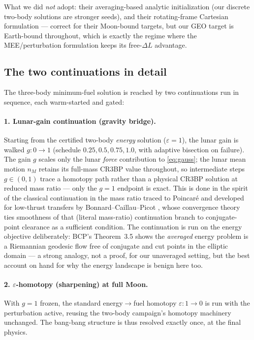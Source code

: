\documentclass[11pt]{article}
\begin{document}
What we did \emph{not} adopt: their averaging-based analytic initialization
(our discrete two-body solutions are stronger seeds), and their
rotating-frame Cartesian formulation --- correct for their Moon-bound
targets, but our GEO target is Earth-bound throughout, which is exactly the
regime where the MEE/perturbation formulation keeps its free-$\Delta L$
advantage.

\subsection{The two continuations in detail}

The three-body minimum-fuel solution is reached by two continuations run in
sequence, each warm-started and gated:

\paragraph{1. Lunar-gain continuation (gravity bridge).}\label{sec:mubridge}
Starting from the certified two-body \emph{energy} solution
($\varepsilon = 1$), the lunar gain is walked $g: 0 \to 1$
(schedule $0.25, 0.5, 0.75, 1.0$, with adaptive bisection on failure). The
gain $g$ scales only the lunar \emph{force} contribution to
\eqref{eq:gauss}; the lunar mean motion $n_M$ retains its full-mass CR3BP
value throughout, so intermediate steps $g \in (0,1)$ trace a homotopy
path rather than a physical CR3BP solution at reduced mass ratio --- only
the $g = 1$ endpoint is exact. This is done in the spirit of the classical
continuation in the mass ratio traced to Poincar\'e and developed for
low-thrust transfers by Bonnard--Caillau--Picot \cite{BCP2010}, whose
convergence theory ties smoothness of that (literal mass-ratio)
continuation branch to conjugate-point clearance as a sufficient
condition. The continuation is run on the energy objective deliberately:
BCP's Theorem~3.5 shows the \emph{averaged} energy problem is a Riemannian
geodesic flow free of conjugate and cut points in the elliptic domain
\cite{BCP2010} --- a strong analogy, not a proof, for our unaveraged
setting, but the best account on hand for why the energy landscape is
benign here too.

\paragraph{2. $\varepsilon$-homotopy (sharpening) at full Moon.}\label{sec:sharpen}
With $g = 1$ frozen, the standard energy$\to$fuel homotopy
$\varepsilon: 1 \to 0$ is run with the perturbation active, reusing the
two-body campaign's homotopy machinery unchanged. The bang-bang structure
is thus resolved exactly once, at the final physics.
\end{document}
